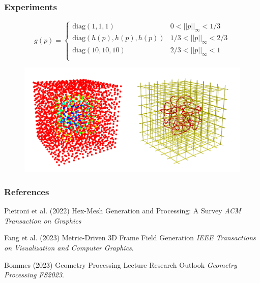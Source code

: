\documentclass[
	11pt, %
	aspectratio=169, %
]{beamer}
\begin{document}
\begin{frame}
	\frametitle{Experiments}
	\begin{equation}
		g(p) = \begin{cases}
			\mathrm{diag}(1,1,1) &0 < ||p||_{\infty} < 1/3 \\
			\mathrm{diag}(h(p), h(p), h(p)) &1/3 < ||p||_{\infty} < 2/3 \\
			\mathrm{diag}(10,10,10) &2/3 < ||p||_{\infty} < 1 \\
	\end{cases}\end{equation}
	\begin{figure}
		\includegraphics[width=0.6\linewidth]{nonuniform.pdf}
	\end{figure}
\end{frame}


\begin{frame} %
	\frametitle{References}
	
	\begin{thebibliography}{99} %
		\footnotesize %
		
			Pietroni et al. (2022)
			\newblock Hex-Mesh Generation and Processing: A Survey
			\newblock \emph{ACM Transaction on Graphics}
			
			Fang et al. (2023)
			\newblock Metric-Driven 3D Frame Field Generation
			\newblock \emph{IEEE Transactions on Visualization and Computer Graphics}.

			Bommes (2023)
			\newblock Geometry Processing Lecture Research Outlook
			\newblock \emph{Geometry Processing FS2023}.
	\end{thebibliography}
\end{frame}
\end{document}
